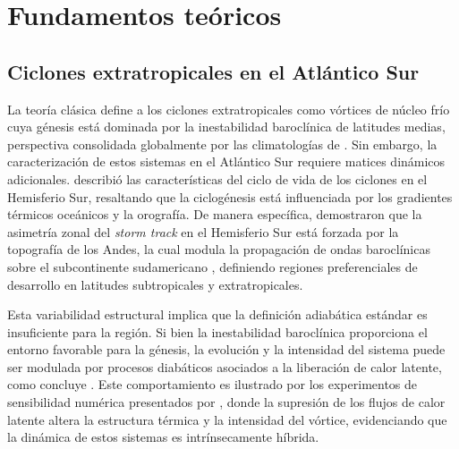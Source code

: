 \chapter{Fundamentos teóricos}\label{ch:theoretical_background}


\section{Ciclones extratropicales en el Atlántico Sur}\label{sec:tb_fundamentos}

La teoría clásica define a los ciclones extratropicales como vórtices de núcleo frío cuya génesis está dominada por la inestabilidad baroclínica de latitudes medias, perspectiva consolidada globalmente por las climatologías de \citet{hoskins2005new}. Sin embargo, la caracterización de estos sistemas en el Atlántico Sur requiere matices dinámicos adicionales. \citet{sinclair1995climatology} describió las características del ciclo de vida de los ciclones en el Hemisferio Sur, resaltando que la ciclogénesis está influenciada por los gradientes térmicos oceánicos y la orografía. De manera específica, \citet{inatsu2004zonal} demostraron que la asimetría zonal del \textit{storm track} en el Hemisferio Sur está forzada por la topografía de los Andes, la cual modula la propagación de ondas baroclínicas sobre el subcontinente sudamericano \citep{vera2002cold}, definiendo regiones preferenciales de desarrollo en latitudes subtropicales y extratropicales.

Esta variabilidad estructural implica que la definición adiabática estándar es insuficiente para la región. Si bien la inestabilidad baroclínica proporciona el entorno favorable para la génesis, la evolución y la intensidad del sistema puede ser modulada por procesos diabáticos asociados a la liberación de calor latente, como concluye \citet{coutodesouza2024thesis}. Este comportamiento es ilustrado por los experimentos de sensibilidad numérica presentados por \citet{reboita2022from}, donde la supresión de los flujos de calor latente altera la estructura térmica y la intensidad del vórtice, evidenciando que la dinámica de estos sistemas es intrínsecamente híbrida.

